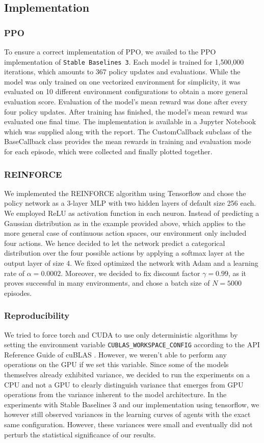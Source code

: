 \documentclass[a4paper, 11pt]{article}
\begin{document}
	\subsection{Implementation}
	\subsubsection{PPO}
	To ensure a correct implementation of PPO, we availed to the PPO implementation of \texttt{Stable Baselines 3}. 
	Each model is trained for 1,500,000 iterations, which amounts to 367 policy updates and evaluations. While the model was only trained on one vectorized environment for simplicity, it was evaluated on 10 different environment configurations to obtain a more general evaluation score. Evaluation of the model's mean reward was done after every four policy updates. After training has finished, the model's mean reward was evaluated one final time.
	The implementation is available in a Jupyter Notebook which was supplied along with the report.
	The CustomCallback subclass of the BaseCallback class provides the mean rewards in training and evaluation mode for each episode, which were collected and finally plotted together.
	\subsubsection{REINFORCE}
	We implemented the REINFORCE algorithm using Tensorflow and chose the policy network as a 3-layer MLP with two hidden layers of default size 256 each. We employed ReLU as activation function in each neuron.
	Instead of predicting a Gaussian distribution as in the example provided above, which applies to the more general case of continuous action spaces, our environment only included four actions. We hence decided to let the network predict a categorical distribution over the four possible actions by applying a softmax layer at the output layer of size 4.
	We fixed optimized the network with Adam and a learning rate of $\alpha=0.0002$. Moreover, we decided to fix discount factor $\gamma=0.99$, as it proves successful in many environments, and chose a batch size of $N=5000$ episodes.
	\subsubsection{Reproducibility}
	We tried to force torch and CUDA to use only deterministic algorithms by setting the environment variable \texttt{CUBLAS\_WORKSPACE\_CONFIG} according to the API Reference Guide of cuBLAS \cite{Nvid.CUDA}. However, we weren't able to perform any operations on the GPU if we set this variable. 
	Since some of the models themselves already exhibited variance, we decided to run the experiments on a CPU and not a GPU to clearly distinguish variance that emerges from GPU operations from the variance inherent to the model architecture.
	In the experiments with Stable Baselines 3 and our implementation using tensorflow, we however still observed variances in the learning curves of agents with the exact same configuration. However, these variances were small and eventually did not perturb the statistical significance of our results.
\end{document}
